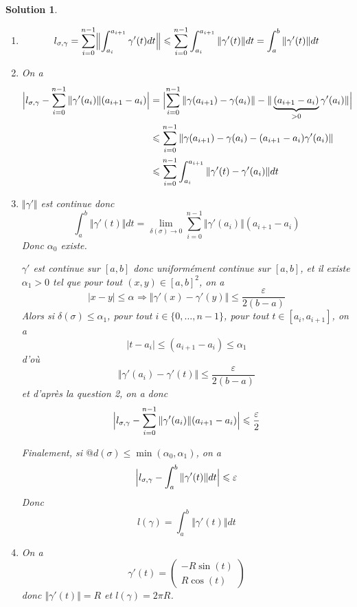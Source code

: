 \documentclass[12pt]{article}
\newtheorem{solution}{Solution}[section]
\theoremstyle{remark}
\numberwithin{equation}{section}
\begin{document}
\begin{solution}
	\phantom{}
	\begin{enumerate}
		\item 
		$$l_{\sigma,\gamma}=\sum_{i=0}^{n-1}\Bigl\Vert\int_{a_{i}}^{a_{i+1}}\gamma'(t)dt\Bigr\Vert\leqslant\sum_{i=0}^{n-1}\int_{a_{i}}^{a_{i+1}}\Vert\gamma'(t)\Vert dt=\int_{a}^{b}\Vert\gamma'(t)\Vert dt$$

		\item On a 
		\begin{align*}
			\Bigl\vert l_{\sigma,\gamma}-\sum_{i=0}^{n-1}\Vert\gamma'(a_{i})\Vert(a_{i+1}-a_{i})\Bigr\vert
			&=\Bigl\vert\sum_{i=0}^{n-1}\Vert\gamma(a_{i+1})-\gamma(a_{i})\Vert-\Vert\underbrace{(a_{i+1}-a_{i})}_{>0}\gamma'(a_{i})\Vert\Bigr\vert\\
			&\leqslant\sum_{i=0}^{n-1}\Vert\gamma(a_{i+1})-\gamma(a_{i})-(a_{i+1}-a_{i})\gamma'(a_{i})\Vert\\
			&\leqslant\sum_{i=0}^{n-1}\int_{a_{i}}^{a_{i+1}}\Vert\gamma'(t)-\gamma'(a_{i})\Vert dt
		\end{align*}

		\item $\Vert\gamma'\Vert$ est continue donc 
		$$\int_{a}^{b}\Vert\gamma'(t)\Vert dt=\lim\limits_{\delta(\sigma)\to0}\sum_{i=0}^{n-1}\Vert\gamma'(a_{i})\Vert(a_{i+1}-a_{i})$$
		Donc $\alpha_{0}$ existe.

		$\gamma'$ est continue sur $[a,b]$ donc uniformément continue sur $[a,b]$, et il existe $\alpha_{1}>0$ tel que pour tout $(x,y)\in[a,b]^{2}$, on a 
		$$\vert x-y\vert\leqslant\alpha_{}\Rightarrow\Vert\gamma'(x)-\gamma'(y)\Vert\leqslant\frac{\varepsilon}{2(b-a)}$$
		Alors si $\delta(\sigma)\leqslant\alpha_{1}$, pour tout $i\in\{0,\dots,n-1\}$, pour tout $t\in[a_{i},a_{i+1}]$, on a
		$$\vert t-a_{i}\vert\leqslant(a_{i+1}-a_{i})\leqslant\alpha_{1}$$
		d'où 
		$$\Vert \gamma'(a_{i})-\gamma'(t)\Vert\leqslant\frac{\varepsilon}{2(b-a)}$$
		et d'après la question 2, on a donc 
		$$\Bigl\vert l_{\sigma,\gamma}-\sum_{i=0}^{n-1}\Vert\gamma'(a_{i})\Vert(a_{i+1}-a_{i})\Bigr\vert\leqslant\frac{\varepsilon}{2}$$

		Finalement, si $@d(\sigma)\leqslant\min(\alpha_{0},\alpha_{1})$, on a 
		$$\Bigl\vert l_{\sigma,\gamma}-\int_{a}^{b}\Vert\gamma'(t)\Vert dt\Bigr\vert\leqslant\varepsilon$$
		Donc 
		$$l(\gamma)=\int_{a}^{b}\Vert\gamma'(t)\Vert dt$$

		\item On a 
		$$\gamma'(t)=\begin{pmatrix}
			-R\sin(t)\\
			R\cos(t)
		\end{pmatrix}$$
		donc $\Vert\gamma'(t)\Vert=R$ et $l(\gamma)=2\pi R$.
	\end{enumerate}
\end{solution}
\end{document}
